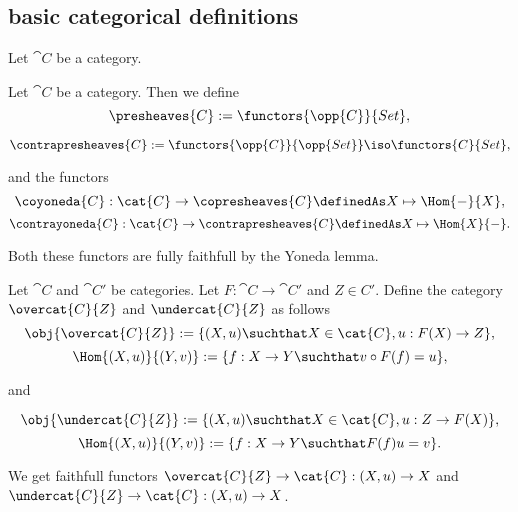 \subsection{basic categorical definitions}

\begin{notation}
Let $\cat{C}$ be a category.
\end{notation}

\begin{definition}

Let $\cat{C}$ be a category. Then we define
\[\presheaves{C} := \functors{\opp{C}}{Set},\]

\[\contrapresheaves{C} := \functors{\opp{C}}{\opp{Set}} \iso \functors{C}{Set},\]

and the functors 
\[\coyoneda{C} : \cat{C} \rightarrow \copresheaves{C} \definedAs X \mapsto \Hom{-}{X},\]
\[\contrayoneda{C} : \cat{C} \rightarrow \contrapresheaves{C} \definedAs  X \mapsto \Hom{X}{-}.\]

Both these functors are fully faithfull by the Yoneda lemma.
\end{definition}

\begin{definition}
Let $\cat{C}$ and $\cat{C'}$ be categories. Let $F:\cat{C}\rightarrow \cat{C'}$ and $Z\in C'$. 
Define the category $\overcat{C}{Z}$ and $\undercat{C}{Z}$ as follows
\[\obj{\overcat{C}{Z}} := \{(X,u) \suchthat X\in \cat{C}, u:F(X)\rightarrow Z\},\]
\[\Hom{(X,u)}{(Y,v)} := \{f:X\rightarrow Y \suchthat v\circ F(f) = u  \},\]

and

\[\obj{\undercat{C}{Z}} := \{(X,u) \suchthat X\in \cat{C}, u:Z\rightarrow F(X)\},\]
\[\Hom{(X,u)}{(Y,v)} := \{f:X\rightarrow Y \suchthat F(f)u = v  \}.\]

We get faithfull functors 
$\overcat{C}{Z} \rightarrow \cat{C}: (X,u)\rightarrow X$ and 
$\undercat{C}{Z} \rightarrow \cat{C}: (X,u)\rightarrow X$.
\end{definition}